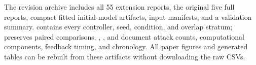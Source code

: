 The revision archive includes all 55 extension reports, the original five full reports, compact fitted initial-model artifacts, input manifests, and a validation summary.  contains every controller, seed, condition, and overlap stratum;  preserves paired comparisons. , , and  document attack counts, computational components, feedback timing, and chronology. All paper figures and generated tables can be rebuilt from these artifacts without downloading the raw CSVs.
